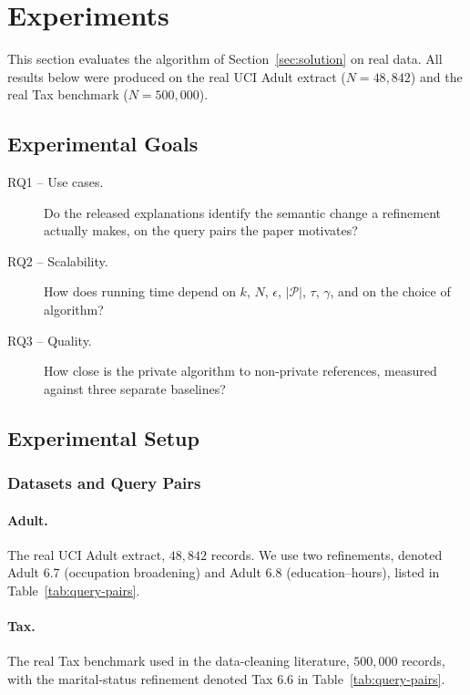 \section{Experiments}
\label{sec:experiments}

This section evaluates the algorithm of Section~\ref{sec:solution} on real data.
All results below were produced on the real UCI Adult extract ($N=48{,}842$) and the real Tax benchmark ($N=500{,}000$).

\subsection{Experimental Goals}
\label{subsec:experimental-goals}

\begin{description}
  \item[RQ1 -- Use cases.] Do the released explanations identify the semantic change a refinement actually makes, on the query pairs the paper motivates?
  \item[RQ2 -- Scalability.] How does running time depend on $k$, $N$, $\epsilon$, $|\mathcal{P}|$, $\tau$, $\gamma$, and on the choice of algorithm?
  \item[RQ3 -- Quality.] How close is the private algorithm to non-private references, measured against three separate baselines?
\end{description}

\subsection{Experimental Setup}
\label{subsec:experimental-setup}

\subsubsection{Datasets and Query Pairs}
\label{subsubsec:datasets}

\paragraph{Adult.} The real UCI Adult extract, $48{,}842$ records.
We use two refinements, denoted Adult 6.7 (occupation broadening) and Adult 6.8 (education--hours), listed in Table~\ref{tab:query-pairs}.

\paragraph{Tax.} The real Tax benchmark used in the data-cleaning literature, $500{,}000$ records, with the marital-status refinement denoted Tax 6.6 in Table~\ref{tab:query-pairs}.

